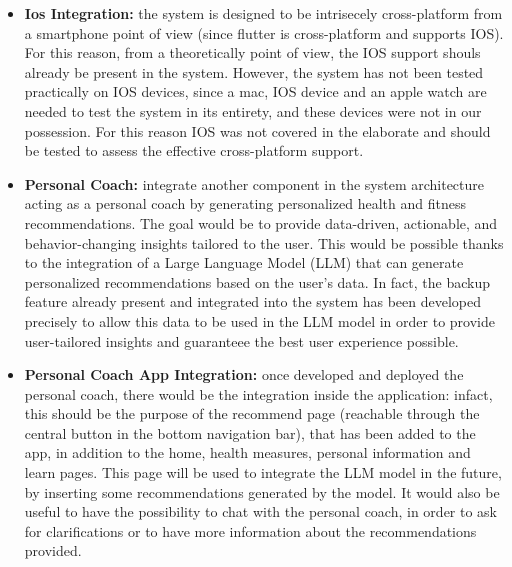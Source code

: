 \begin{itemize}[nosep] %
    \item \textbf{Ios Integration:} the system is designed to be intrisecely cross-platform from a smartphone point of view (since flutter is cross-platform and supports IOS). For this reason, from a theoretically point of view, the IOS support shouls already be present in the system. However, the system has not been tested practically on IOS devices, since a mac, IOS device and an apple watch are needed to test the system in its entirety, and these devices were not in our possession. For this reason IOS was not covered in the elaborate and should be tested to assess the effective cross-platform support.
    \item \textbf{Personal Coach:} integrate another component in the system architecture acting as a personal coach by generating personalized health and fitness recommendations. The goal would be to provide data-driven, actionable, and behavior-changing insights tailored to the user. This would be possible thanks to the integration of a Large Language Model (LLM) that can generate personalized recommendations based on the user's data. In fact, the backup feature already present and integrated into the system has been developed precisely to allow this data to be used in the LLM model in order to provide user-tailored insights and guaranteee the best user experience possible.
    \item \textbf{Personal Coach App Integration:} once developed and deployed the personal coach, there would be the integration inside the application: infact, this should be the purpose of the recommend page (reachable through the central button in the bottom navigation bar), that has been added to the app, in addition to the home, health measures, personal information and learn pages. This page will be used to integrate the LLM model in the future, by inserting some recommendations generated by the model. It would also be useful to have the possibility to chat with the personal coach, in order to ask for clarifications or to have more information about the recommendations provided.
\end{itemize}